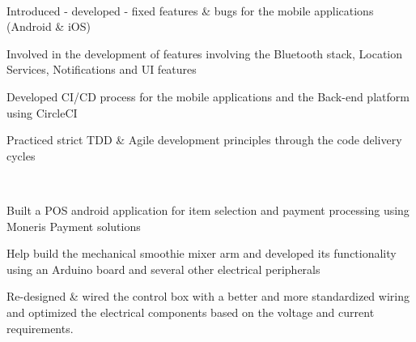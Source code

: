 \documentclass[a4paper]{resume}
\begin{document}
\begin{minipage}[t]{0.66\textwidth}
 \\
\vspace{\topsep} %
\begin{tightemize}
\item Introduced - developed - fixed features \& bugs for the mobile applications (Android \& iOS)
\item Involved in the development of features involving the Bluetooth stack, Location Services, Notifications and UI features
\item Developed CI/CD process for the mobile applications and the Back-end platform using CircleCI
\item Practiced strict TDD \& Agile development principles through the code delivery cycles
\end{tightemize}
\sectionsep

 \\
\vspace{\topsep} %
\begin{tightemize}
\item Built a POS android application for item selection and payment processing using Moneris Payment solutions
\item Help build the mechanical smoothie mixer arm and developed its functionality using an Arduino board and several other electrical peripherals
\item Re-designed \& wired the control box with a better and more standardized wiring and optimized the electrical components based on the voltage and current requirements.
\end{tightemize}
\sectionsep

\end{minipage} 
\end{document}
